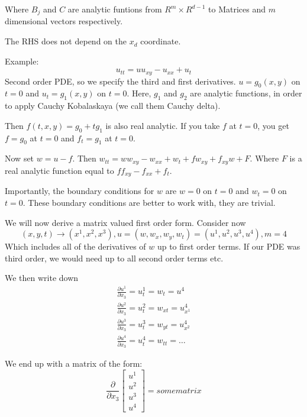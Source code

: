 \documentclass{article}
\numberwithin{equation}{section}
\theoremstyle{definition}
\newcommand{\pp}[2]{\frac{\partial #1}{\partial #2}}
\begin{document}
Where $B_j$ and $C$ are analytic funtions from $R^m \times R^{d-1}$ to Matrices and $m$ dimensional vectors respectively.

The RHS does not depend on the $x_d$ coordinate.

Example:
\begin{equation}
    u_{tt} = uu_{xy} - u_{xx} + u_t
\end{equation}
Second order PDE, so we specify the third and first derivatives. $u = g_0(x,y)$ on $t=0$ and $u_t = g_1(x,y)$ on $t=0$. Here, $g_1$ and $g_2$ are analytic functions, in order to apply Cauchy Kobalaskaya (we call them Cauchy delta).

Then $f(t,x,y) = g_0 + tg_1$ is also real analytic. If you take $f$ at $t=0$, you get $f =  g_0$ at $t=0$ and $f_t  = g_1$ at $t=0$.

Now set $w = u-f$.
Then $w_{tt} = ww_{xy} - w_{xx} + w_t + fw_{xy} + f_{xy}w + F$.
Where $F$ is a real analytic function equal to $ff_{xy} - f_{xx}+f_t$.

Importantly, the boundary conditions for $w$ are $w = 0$ on $t=0$ and $w_t = 0$ on $t=0$. These boundary conditions are better to work with, they are trivial.

We will now derive a matrix valued first order form.
Consider now 
\begin{equation}
    (x,y,t) \to (x^1,x^2,x^3), u=  (w,w_x,w_y,w_t) = (u^1,u^2,u^3,u^4), m=4
\end{equation}
Which includes all of the derivatives of $w$ up to first order terms. If our PDE was third order, we would need up to all second order terms etc.

We then write down
\begin{align}
    \pp{u^1}{x_3} = u^1_t = w_t = u^4 \\
    \pp{u^2}{x_3} = u^2_t = w_{xt} = u^4_{x^1} \\
    \pp{u^3}{x_3} = u^3_t = w_{yt} = u^4_{x^2} \\
    \pp{u^4}{x_3} = u^4_t = w_{tt} = \dots
\end{align}

We end up with a matrix of the form:
\begin{equation}
    \pp{}{x_3} \begin{bmatrix}
        u^1 \\
        u^2 \\
        u^3 \\
        u^4
    \end{bmatrix}
    = some matrix
\end{equation}
\end{document}
